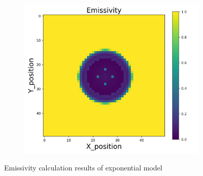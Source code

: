 \begin{figure}[p]
\begin{minipage}{\textwidth}
\begin{subfigure}{0.325\textwidth}
        \end{subfigure}
        \begin{subfigure}{0.325\textwidth}
            \centering
            \includegraphics[width=\textwidth]{figures/raw_data/33/exp/emi_cal.jpg}
        \end{subfigure}
    \end{minipage}
    \caption{Emissivity calculation results of exponential model}  
\end{figure}


\newpage
